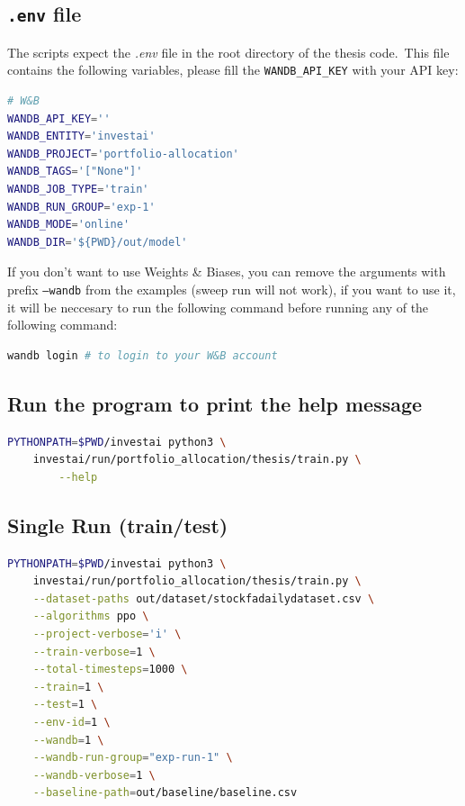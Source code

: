 \documentclass[../xlapes02]{subfiles}
\begin{document}
    \subsection{\texttt{.env} file}\label{subsec:texttt{.env}-file}
    The scripts expect the \emph{.env} file in the root directory of the thesis code.\ This file contains the following variables, please fill the \texttt{WANDB\_API\_KEY} with your API key:
    \begin{lstlisting}[language=bash,label={lst:env-file}]
# W&B
WANDB_API_KEY=''
WANDB_ENTITY='investai'
WANDB_PROJECT='portfolio-allocation'
WANDB_TAGS='["None"]'
WANDB_JOB_TYPE='train'
WANDB_RUN_GROUP='exp-1'
WANDB_MODE='online'
WANDB_DIR='${PWD}/out/model'
    \end{lstlisting}
    If you don't want to use Weights \& Biases, you can remove the arguments with prefix \texttt{--wandb} from the examples (sweep run will not work), if you want to use it, it will be neccesary to run the following command before running any of the following command:
    \begin{lstlisting}[language=bash,label={lst:wandb-login}]
wandb login # to login to your W&B account
    \end{lstlisting}

    \subsection{Run the program to print the help message}\label{subsec:run-the-program-to-print-the-help-message}
    \begin{lstlisting}[language=bash,label={lst:help}]
PYTHONPATH=$PWD/investai python3 \
    investai/run/portfolio_allocation/thesis/train.py \
        --help
    \end{lstlisting}

    \subsection{Single Run (train/test)}\label{subsec:single-run-(train/test)}
    \begin{lstlisting}[language=bash,label={lst:run-train}]
PYTHONPATH=$PWD/investai python3 \
    investai/run/portfolio_allocation/thesis/train.py \
    --dataset-paths out/dataset/stockfadailydataset.csv \
    --algorithms ppo \
    --project-verbose='i' \
    --train-verbose=1 \
    --total-timesteps=1000 \
    --train=1 \
    --test=1 \
    --env-id=1 \
    --wandb=1 \
    --wandb-run-group="exp-run-1" \
    --wandb-verbose=1 \
    --baseline-path=out/baseline/baseline.csv
    \end{lstlisting}
\end{document}
